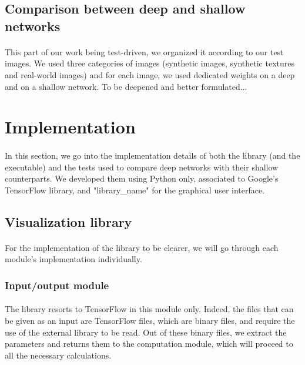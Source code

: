 \documentclass[a4paper]{article}
\begin{document}
\subsection{Comparison between deep and shallow networks}
\paragraph{}This part of our work being test-driven, we organized it according to our test images. We used three categories of images (synthetic images, synthetic textures and real-world images) and for each image, we used dedicated weights on a deep and on a shallow network. To be deepened and better formulated...


\section{Implementation}
\paragraph{}In this section, we go into the implementation details of both the library (and the executable) and the tests used to compare deep networks with their shallow counterparts. We developed them using Python only, associated to Google's TensorFlow library, and "library\_name" for the graphical user interface.

\subsection{Visualization library}
\paragraph{}For the implementation of the library to be clearer, we will go through each module's implementation individually.

\subsubsection{Input/output module}
\paragraph{}The library resorts to TensorFlow in this module only. Indeed, the files that can be given as an input are TensorFlow files, which are binary files, and require the use of the external library to be read. Out of these binary files, we extract the parameters and returns them to the computation module, which will proceed to all the necessary calculations.
\end{document}
